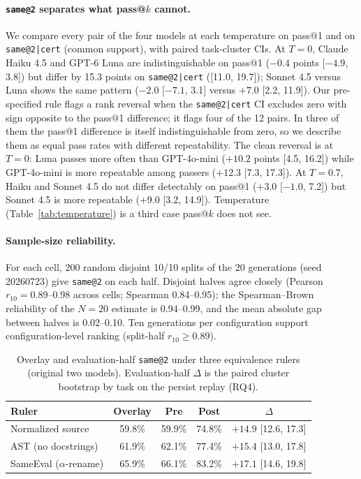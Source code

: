 \documentclass[acmsmall,screen,review,anonymous]{acmart}
\makeatletter
\newcommand{\sameeval}{SameEval}
\newcommand{\sameat}{\mbox{\texttt{same@2}}}
\newcommand{\sameatc}{\mbox{\texttt{same@2|cert}}}
\makeatother
\begin{document}
\paragraph{\textup{\sameat{}} separates what pass@$k$ cannot.}
We compare every pair of the four models at each temperature on pass@1 and on
\sameatc{} (common support), with paired task-cluster CIs.
At $T{=}0$, Claude Haiku 4.5 and GPT-6 Luna are indistinguishable on pass@1
($-0.4$ points [$-4.9$, 3.8]) but differ by 15.3 points on \sameatc{}
([11.0, 19.7]); Sonnet 4.5 versus Luna shows the same pattern ($-2.0$
[$-7.1$, 3.1] versus $+7.0$ [2.2, 11.9]).
Our pre-specified rule flags a rank reversal when the \sameatc{} CI excludes
zero with sign opposite to the pass@1 difference; it flags four of the 12
pairs.
In three of them the pass@1 difference is itself indistinguishable from
zero, so we describe them as equal pass rates with different repeatability.
The clean reversal is at $T{=}0$: Luna passes more often than GPT-4o-mini
($+10.2$ points [4.5, 16.2]) while GPT-4o-mini is more repeatable among passers
($+12.3$ [7.3, 17.3]).
At $T{=}0.7$, Haiku and Sonnet 4.5 do not differ detectably on pass@1
($+3.0$ [$-1.0$, 7.2]) but Sonnet 4.5 is more repeatable ($+9.0$
[3.2, 14.9]).
Temperature (Table~\ref{tab:temperature}) is a third case pass@$k$ does not
see.

\paragraph{Sample-size reliability.}
For each cell, 200 random disjoint 10/10 splits of the 20 generations
(seed 20260723) give \sameat{} on each half.
Disjoint halves agree closely (Pearson $r_{10}{=}0.89$--$0.98$ across cells;
Spearman 0.84--0.95); the Spearman--Brown reliability of the $N{=}20$ estimate
is 0.94--0.99, and the mean absolute gap between halves is 0.02--0.10.
Ten generations per configuration support configuration-level ranking (split-half $r_{10}{\ge}0.89$).

\begin{table}[t]
  \small
  \caption{Overlay and evaluation-half \sameat{} under three equivalence rulers
    (original two models).
    Evaluation-half $\Delta$ is the paired cluster bootstrap by task on the persist
    replay (RQ4).}
  \label{tab:fingerprint}
  \begin{tabular}{lcccc}
    \toprule
    Ruler & Overlay & Pre & Post & $\Delta$ \\
    \midrule
    Normalized source & 59.8\% & 59.9\% & 74.8\% & $+14.9$ [12.6, 17.3] \\
    AST (no docstrings) & 61.9\% & 62.1\% & 77.4\% & $+15.4$ [13.0, 17.8] \\
    \sameeval{} ($\alpha$-rename) & 65.9\% & 66.1\% & 83.2\% & $+17.1$ [14.6, 19.8] \\
    \bottomrule
  \end{tabular}
\end{table}
\end{document}
